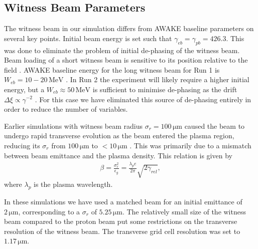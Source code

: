 \documentclass[aps,prstab,reprint,amsmath,amssymb,groupedaddress]{revtex4-1}
\newcommand{\unit}[1]{\,\mathrm{#1}}
\begin{document}
\subsection[\label{S:M:Setup}]{Witness Beam Parameters}

The witness beam in our simulation differs from AWAKE baseline parameters on several key points. Initial beam energy is
set such that $\gamma_{eb} = \gamma_{pb} = 426.3$. This was done to eliminate the problem of initial de-phasing of the
witness beam. Beam loading of a short witness beam is sensitive to its position relative to the field
\cite{tzoufras:2009}. AWAKE baseline energy for the long witness beam for Run 1 is $W_{eb} = 10-20\unit{MeV}$
\cite{gschwendtner:2016}. In Run 2 the experiment will likely require a higher initial energy, but a
$W_{eb} \approx 50\unit{MeV}$ is sufficient to minimise de-phasing as the drift $\Delta\xi \propto \gamma^{-2}$
\cite{berglyd_olsen:2015}. For this case we have eliminated this source of de-phasing entirely in order to reduce the
number of variables.

Earlier simulations with witness beam radius $\sigma_{r} = 100\unit{\mu m}$ caused the beam to undergo rapid transverse
evolution as the beam entered the plasma region, reducing its $\sigma_{r}$ from $100\unit{\mu m}$ to $< 10\unit{\mu m}$
\cite{berglyd_olsen:2016}. This was primarily due to a mismatch between beam emittance and the plasma density. This
relation is given by
\begin{align}
    \beta = \frac{\sigma_r^2}{\epsilon_g} = \frac{\lambda_pe}{2\pi}\sqrt{2\gamma_{rel}}, \label{EQ:Matched}
\end{align}
where $\lambda_{p}$ is the plasma wavelength.

In these simulations we have used a matched beam for an initial emittance of $2\unit{\mu m}$, corresponding to a
$\sigma_{r}$ of $5.25\unit{\mu m}$. The relatively small size of the witness beam compared to the proton beam put some
restrictions on the transverse resolution of the witness beam. The transverse grid cell resolution was set to
$1.17\unit{\mu m}$.

\end{document}
